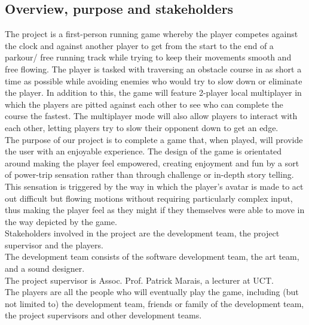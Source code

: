\documentclass[a4paper,10pt]{article}
\begin{document}
\subsection{Overview, purpose and stakeholders}
The project is a first-person running game whereby the player competes against the clock and against another player to get from the start to the end of a parkour/ free running track while trying to keep their movements smooth and free flowing. The player is tasked with traversing an obstacle course in as short a time as possible while avoiding enemies who would try to slow down or eliminate the player. In addition to this, the game will feature 2-player local multiplayer in which the players are pitted against each other to see who can complete the course the fastest. The multiplayer mode will also allow players to interact with each other, letting players try to slow their opponent down to get an edge.
\smallskip\\
The purpose of our project is to complete a game that, when played, will provide the user with an enjoyable experience. The design of the game is orientated around making the player feel empowered, creating enjoyment and fun by a sort of power-trip sensation rather than through challenge or in-depth story telling. This sensation is triggered by the way in which the player's avatar is made to act out difficult but flowing motions without requiring particularly complex input, thus making the player feel as they might if they themselves were able to move in the way depicted by the game.
\smallskip\\
Stakeholders involved in the project are the development team, the project supervisor and the players. \\
The development team consists of the software development team, the art team, and a sound designer. \\
The project supervisor is Assoc. Prof. Patrick Marais, a lecturer at UCT. \\
The players are all the people who will eventually play the game, including (but not limited to) the development team, friends or family of the development team, the project supervisors and other development teams.
\end{document}
